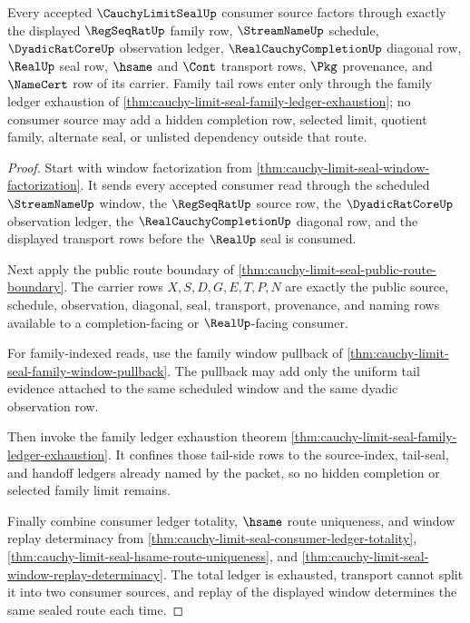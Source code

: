 \begin{theorem}
\label{thm:cauchy-limit-seal-source-factorization}
Every accepted $\CauchyLimitSealUp$ consumer source factors through exactly the displayed $\RegSeqRatUp$ family row, $\StreamNameUp$ schedule, $\DyadicRatCoreUp$ observation ledger, $\RealCauchyCompletionUp$ diagonal row, $\RealUp$ seal row, $\hsame$ and $\Cont$ transport rows, $\Pkg$ provenance, and $\NameCert$ row of its carrier. Family tail rows enter only through the family ledger exhaustion of \autoref{thm:cauchy-limit-seal-family-ledger-exhaustion}; no consumer source may add a hidden completion row, selected limit, quotient family, alternate seal, or unlisted dependency outside that route.
\end{theorem}
\begin{proof}
Start with window factorization from \autoref{thm:cauchy-limit-seal-window-factorization}. It sends every accepted consumer read through the scheduled $\StreamNameUp$ window, the $\RegSeqRatUp$ source row, the $\DyadicRatCoreUp$ observation ledger, the $\RealCauchyCompletionUp$ diagonal row, and the displayed transport rows before the $\RealUp$ seal is consumed.

Next apply the public route boundary of \autoref{thm:cauchy-limit-seal-public-route-boundary}. The carrier rows $X,S,D,G,E,T,P,N$ are exactly the public source, schedule, observation, diagonal, seal, transport, provenance, and naming rows available to a completion-facing or $\RealUp$-facing consumer.

For family-indexed reads, use the family window pullback of \autoref{thm:cauchy-limit-seal-family-window-pullback}. The pullback may add only the uniform tail evidence attached to the same scheduled window and the same dyadic observation row.

Then invoke the family ledger exhaustion theorem \autoref{thm:cauchy-limit-seal-family-ledger-exhaustion}. It confines those tail-side rows to the source-index, tail-seal, and handoff ledgers already named by the packet, so no hidden completion or selected family limit remains.

Finally combine consumer ledger totality, $\hsame$ route uniqueness, and window replay determinacy from \autoref{thm:cauchy-limit-seal-consumer-ledger-totality}, \autoref{thm:cauchy-limit-seal-hsame-route-uniqueness}, and \autoref{thm:cauchy-limit-seal-window-replay-determinacy}. The total ledger is exhausted, transport cannot split it into two consumer sources, and replay of the displayed window determines the same sealed route each time.
\end{proof}

